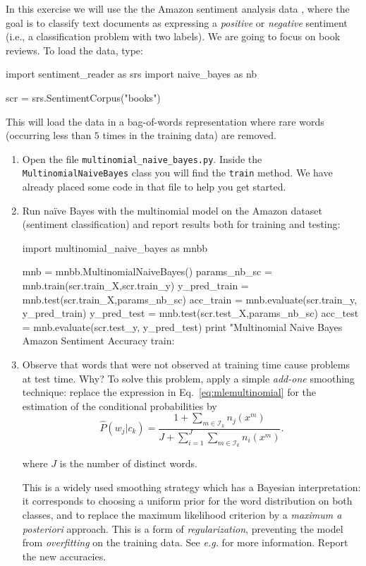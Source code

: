 \begin{exercise}
In this exercise we will use the the Amazon sentiment analysis data \citep{blitzer2007biographies}, 
where the goal is to classify text documents as expressing a \emph{positive} or \emph{negative} sentiment 
(i.e., a classification problem with two labels). We are going to focus on book reviews. 
To load the data, type:
\begin{python}
import sentiment_reader as srs
import naive_bayes as nb

scr = srs.SentimentCorpus("books")
\end{python}
This will load the data in a bag-of-words representation where rare words (occurring less than $5$ times in the training data) are removed. 

\begin{enumerate}
\item Open the file {\tt multinomial\_naive\_bayes.py}. Inside the {\tt MultinomialNaiveBayes} class you will find the {\tt train} method. We have already placed some code in that file to help you get started.

\item Run na\"ive Bayes with the multinomial model on the Amazon
  dataset (sentiment classification) and report results both for
  training and testing: 
    
\begin{python}
import multinomial_naive_bayes as mnbb

mnb = mnbb.MultinomialNaiveBayes()
params_nb_sc = mnb.train(scr.train_X,scr.train_y)
y_pred_train = mnb.test(scr.train_X,params_nb_sc)
acc_train = mnb.evaluate(scr.train_y, y_pred_train)
y_pred_test = mnb.test(scr.test_X,params_nb_sc)
acc_test = mnb.evaluate(scr.test_y, y_pred_test)
print "Multinomial Naive Bayes Amazon Sentiment Accuracy train: %
\end{python}


\item Observe that words that were not observed at training time cause problems at test time. Why? 
To solve this problem, apply a simple \emph{add-one} smoothing technique: replace the expression in Eq.~\ref{eq:mlemultinomial} 
for the estimation of the conditional probabilities 
by
$${\hat P}(w_j|c_k) = \frac{1+\sum_ {m \in \mathcal{I}_k} n_j(x^m)}{J + \sum_{i=1}^J \sum_ {m\in \mathcal{I}_k} n_i(x^m)}.$$


where $J$ is the number of distinct words. 

This is a widely used smoothing strategy which has a Bayesian interpretation: it corresponds to choosing a uniform prior 
for the word distribution on both classes, and to replace the maximum likelihood criterion by a \emph{maximum a posteriori} approach. 
This is a form of \emph{regularization}, preventing the model from \emph{overfitting} on the training data. 
See \emph{e.g.} \citet{Manning1999,Manning2008} for more information. 
Report the new accuracies. 
\end{enumerate}
\end{exercise}

